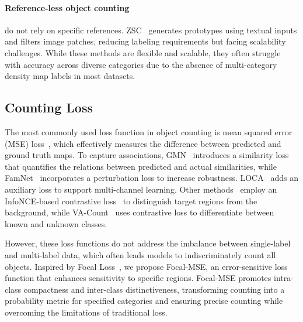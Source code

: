 \paragraph{Reference-less object counting} do not rely on specific references. ZSC~\cite{xu2023zero} generates prototypes using textual inputs and filters image patches, reducing labeling requirements but facing scalability challenges. While these methods are flexible and scalable, they often struggle with accuracy across diverse categories due to the absence of multi-category density map labels in most datasets.

\subsection{Counting Loss}
The most commonly used loss function in object counting is mean squared error (MSE) loss~\cite{ranjan2021learning}, which effectively measures the difference between predicted and ground truth maps. To capture associations, GMN~\cite{lu2019class} introduces a similarity loss that quantifies the relations between predicted and actual similarities, while FamNet~\cite{ranjan2021learning} incorporates a perturbation loss to increase robustness. LOCA~\cite{djukic2023low} adds an auxiliary loss to support multi-channel learning. Other methods~\cite{jiang2023clip, huang2023point} employ an InfoNCE-based contrastive loss~\cite{oord2018representation} to distinguish target regions from the background, while VA-Count~\cite{zhu2024zero} uses contrastive loss to differentiate between known and unknown classes.

However, these loss functions do not address the imbalance between single-label and multi-label data, which often leads models to indiscriminately count all objects. Inspired by Focal Loss~\cite{lin2017focal}, we propose Focal-MSE, an error-sensitive loss function that enhances sensitivity to specific regions. Focal-MSE promotes intra-class compactness and inter-class distinctiveness, transforming counting into a probability metric for specified categories and ensuring precise counting while overcoming the limitations of traditional loss.


